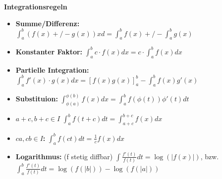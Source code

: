 \textbf{Integrationsregeln}
\begin{itemize}
    \item \textbf{Summe/Differenz:} $\int_a^b (f(x) +/- g(x)) xd = \int_a^b f(x) +/- \int_a^b g(x)$\\
    \item \textbf{Konstanter Faktor:} $\int_a^b c\cdot f(x)dx = c\cdot \int_a^b f(x)dx$\\
    \item \textbf{Partielle Integration:} $\int_a^b f'(x)\cdot g(x)dx = \left[f(x)g(x)\right]_a^b - \int_a^b f(x)g'(x)$\\
    \item \textbf{Substituion:} $\int_{\phi(a)}^{\phi(b)} f(x)dx = \int_a^b f(\phi(t))\phi '(t) dt$\\
    \item \textbf{$a+c, b+c \in I$} $\int_a^b f(t+c)dt = \int_{a+c}^{b+c} f(x)dx$\\
    \item \textbf{$ca,cb\in I$: } $\int_a^b f(ct)dt = \frac{1}{c}f(x)dx$\\
    \item \textbf{Logarithmus: }\;(f stetig diffbar) $\int\frac{f'(t)}{f(t)}dt = \log(|f(x)|)$, bzw. $\int_a^b\frac{f'(t)}{f(t)}dt = \log(f(|b|)) - \log(f(|a|))$
\end{itemize}

